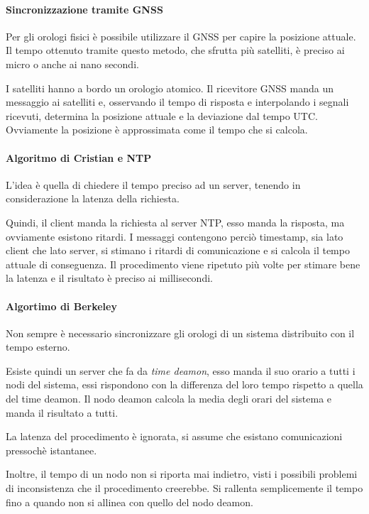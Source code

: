 \paragraph{Sincronizzazione tramite GNSS}
Per gli orologi fisici è possibile utilizzare 
il GNSS per capire la posizione attuale. 
Il tempo ottenuto tramite questo metodo, 
che sfrutta più satelliti, 
è preciso ai micro o anche ai nano secondi. 

I satelliti hanno a bordo un orologio atomico.
Il ricevitore GNSS manda un messaggio ai satelliti e, 
osservando il tempo di risposta e interpolando 
i segnali ricevuti, determina la posizione attuale e 
la deviazione dal tempo UTC. Ovviamente la 
posizione è approssimata come il tempo che si calcola.

\paragraph{Algoritmo di Cristian e NTP}
L'idea è quella di chiedere il tempo preciso ad un server,
tenendo in considerazione la latenza della richiesta.

Quindi, il client manda la richiesta al server NTP, 
esso manda la risposta, ma ovviamente esistono ritardi.
I messaggi contengono perciò timestamp, sia lato client che 
lato server, si stimano i ritardi di comunicazione e si calcola
il tempo attuale di conseguenza. Il procedimento 
viene ripetuto più volte per stimare bene la latenza e il 
risultato è preciso ai millisecondi.

\paragraph{Algortimo di Berkeley}
Non sempre è necessario sincronizzare gli orologi 
di un sistema distribuito con il tempo esterno. 

Esiste quindi un server che fa da \emph{time deamon}, 
esso manda il suo orario a tutti i nodi 
del sistema, essi rispondono con la differenza 
del loro tempo rispetto a quella del time deamon. 
Il nodo deamon calcola la media degli orari del sistema 
e manda il risultato a tutti. 

La latenza del procedimento è ignorata, si assume che 
esistano comunicazioni pressochè istantanee.

Inoltre, il tempo di un nodo non si riporta mai indietro, 
visti i possibili problemi di inconsistenza che il procedimento 
creerebbe. Si rallenta semplicemente il tempo fino a quando 
non si allinea con quello del nodo deamon.


